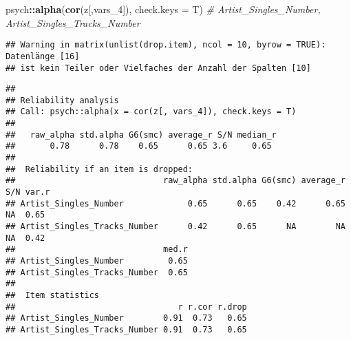 \documentclass[
]{article}
\newenvironment{Shaded}{\begin{snugshade}}{\end{snugshade}}
\newcommand{\CommentTok}[1]{\textcolor[rgb]{0.56,0.35,0.01}{\textit{#1}}}
\newcommand{\DataTypeTok}[1]{\textcolor[rgb]{0.13,0.29,0.53}{#1}}
\newcommand{\DecValTok}[1]{\textcolor[rgb]{0.00,0.00,0.81}{#1}}
\newcommand{\KeywordTok}[1]{\textcolor[rgb]{0.13,0.29,0.53}{\textbf{#1}}}
\newcommand{\NormalTok}[1]{#1}
\newcommand{\OperatorTok}[1]{\textcolor[rgb]{0.81,0.36,0.00}{\textbf{#1}}}
\begin{document}
\begin{Shaded}
\begin{Highlighting}[]
\NormalTok{psych}\OperatorTok{::}\KeywordTok{alpha}\NormalTok{(}\KeywordTok{cor}\NormalTok{(z[,vars_}\DecValTok{4}\NormalTok{]), }\DataTypeTok{check.keys =}\NormalTok{ T) }\CommentTok{# Artist_Singles_Number, Artist_Singles_Tracks_Number}
\end{Highlighting}
\end{Shaded}

\begin{verbatim}
## Warning in matrix(unlist(drop.item), ncol = 10, byrow = TRUE): Datenlänge [16]
## ist kein Teiler oder Vielfaches der Anzahl der Spalten [10]
\end{verbatim}

\begin{verbatim}
## 
## Reliability analysis   
## Call: psych::alpha(x = cor(z[, vars_4]), check.keys = T)
## 
##   raw_alpha std.alpha G6(smc) average_r S/N median_r
##       0.78      0.78    0.65      0.65 3.6     0.65
## 
##  Reliability if an item is dropped:
##                              raw_alpha std.alpha G6(smc) average_r S/N var.r
## Artist_Singles_Number             0.65      0.65    0.42      0.65  NA  0.65
## Artist_Singles_Tracks_Number      0.42      0.65      NA        NA  NA  0.42
##                              med.r
## Artist_Singles_Number         0.65
## Artist_Singles_Tracks_Number  0.65
## 
##  Item statistics 
##                                 r r.cor r.drop
## Artist_Singles_Number        0.91  0.73   0.65
## Artist_Singles_Tracks_Number 0.91  0.73   0.65
\end{verbatim}
\end{document}
